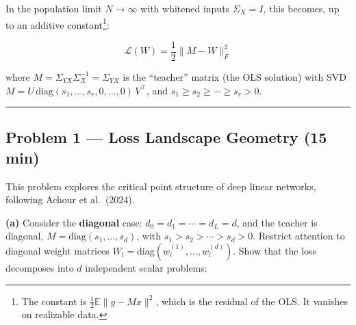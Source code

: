 \documentclass[
]{article}
\begin{document}
In the population limit \(N \to \infty\) with whitened inputs \(\Sigma_X = I\), this becomes, up to an additive constant\footnote{The constant is \(\frac{1}{2}\mathbb{E}\|y - Mx\|^2\), which is the residual of the OLS. It vanishes on realizable data.}:

\[\mathcal{L}(W) = \frac{1}{2}\|M - W\|_F^2\]

where \(M = \Sigma_{YX} \Sigma_X^{-1} = \Sigma_{YX}\) is the ``teacher'' matrix (the
OLS solution) with SVD
\(M = U \,\text{diag}(s_1, \ldots, s_r, 0, \ldots, 0)\, V^\top\), and
\(s_1 \geq s_2 \geq \cdots \geq s_r > 0\).

%
%
%
%
%
%

\begin{center}\rule{0.5\linewidth}{0.5pt}\end{center}

\subsection{Problem 1 --- Loss Landscape Geometry (15
min)}\label{problem-1-loss-landscape-geometry-15-min}

This problem explores the critical point structure of deep linear
networks, following Achour et al.~(2024).

\textbf{(a)} Consider the \textbf{diagonal} case:
\(d_0 = d_1 = \cdots = d_L = d\), and the teacher is diagonal,
\(M = \text{diag}(s_1, \ldots, s_d)\), with
\(s_1 > s_2 > \cdots > s_d > 0\). Restrict attention to diagonal weight
matrices \(W_l = \text{diag}(w_l^{(1)}, \ldots, w_l^{(d)})\). Show that
the loss decomposes into \(d\) independent scalar problems:
\end{document}
